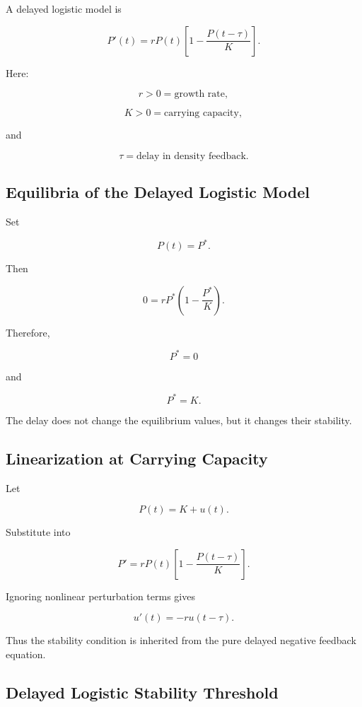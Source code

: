 A delayed logistic model is

\[
\boxed{
P'(t)
=
rP(t)
\left[
1-
\frac{
P(t-\tau)
}{
K
}
\right].
}
\]

Here:

\[
r>0
=
\text{growth rate},
\]

\[
K>0
=
\text{carrying capacity},
\]

and

\[
\tau
=
\text{delay in density feedback}.
\]

\subsection{Equilibria of the Delayed Logistic Model}
\label{subsec:delayed-logistic-equilibria}

Set

\[
P(t)=P^*.
\]

Then

\[
0
=
rP^*
\left(
1-\frac{P^*}{K}
\right).
\]

Therefore,

\[
\boxed{
P^*=0
}
\]

and

\[
\boxed{
P^*=K.
}
\]

The delay does not change the equilibrium values, but it changes their
stability.

\subsection{Linearization at Carrying Capacity}
\label{subsec:delayed-logistic-linearization}

Let

\[
P(t)=K+u(t).
\]

Substitute into

\[
P'
=
rP(t)
\left[
1-\frac{P(t-\tau)}{K}
\right].
\]

Ignoring nonlinear perturbation terms gives

\[
\boxed{
u'(t)
=
-r u(t-\tau).
}
\]

Thus the stability condition is inherited from the pure delayed negative
feedback equation.

\subsection{Delayed Logistic Stability Threshold}
\label{subsec:delayed-logistic-stability-threshold}

